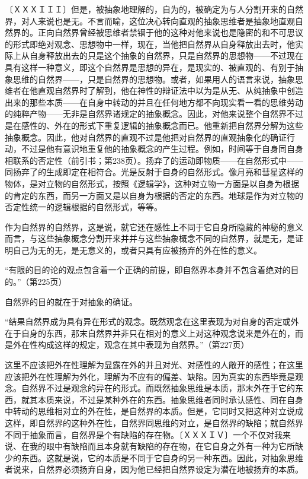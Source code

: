 \documentclass[a4paper,twoside,12pt]{ctexart}
\begin{document}
〔ＸＸＸＩＩＩ〕但是，被抽象地理解的，自为的，被确定为与人分割开来的自然界，对人来说也是无。不言而喻，这位决心转向直观的抽象思维者是抽象地直观自然界的。正向自然界曾经被思维者禁锢于他的这种对他来说也是隐密的和不可思议的形式即绝对观念、思想物中一样，现在，当他把自然界从自身释放出去时，他实际上从自身释放出去的只是这个抽象的自然界，只是自然界的思想物——不过现在具有这样一种意义，即这个自然界是思想的异在，是现实的、被直观的、有别于抽象思维的自然界——，只是自然界的思想物。或者，如果用人的语言来说，抽象思维者在他直观自然界时了解到，他在神性的辩证法中以为是从无、从纯抽象中创造出来的那些本质——在自身中转动的并且在任何地方都不向现实看一看的思维劳动的纯粹产物——无非是自然界诸规定的抽象概念。因此，对他来说整个自然界不过是在感性的、外在的形式下重复逻辑的抽象概念而已。他重新把自然界分解为这些抽象概念。因此，他对自然界的直观不过是他把对自然界的直观抽象化的确证行动，不过是他有意识地重复他的抽象概念的产生过程。例如，时间等于自身同自身相联系的否定性（前引书；第238页）。扬弃了的运动即物质——在自然形式中——同扬弃了的生成即定在相符合。光是反射于自身的自然形式。像月亮和彗星这样的物体，是对立物的自然形式，按照《逻辑学》，这种对立物一方面是以自身为根据的肯定的东西，而另一方面又是以自身为根据的否定的东西。地球是作为对立物的否定性统一的逻辑根据的自然形式，等等。

作为自然界的自然界，这是说，就它还在感性上不同于它自身所隐藏的神秘的意义而言，与这些抽象概念分割开来并并与这些抽象概念不同的自然界，就是无，是证明自己为无的无，是无意义的，或者只具有应被扬弃的外在性的意义。

\begin{fangsong}
“有限的目的论的观点包含着一个正确的前提，即自然界本身并不包含着绝对的目的。”（第225页）
\end{fangsong}

自然界的目的就在于对抽象的确证。

\begin{fangsong}
“结果自然界成为具有异在形式的观念。既然观念在这里表现为对自身的否定或外在于自身的东西，那末自然界并非只在相对的意义上对这种观念说来是外在的，而是外在性构成这样的规定，观念在其中表现为自然界。”（第227页）
\end{fangsong}

这里不应该把外在性理解为显露在外的并且对光、对感性的人敞开的感性；在这里应该把外在性理解为外化，理解为不应有的偏差、缺陷。因为真实的东西毕竟是观念。自然界不过是观念的异在的形式。而既然抽象思维是本质，那末外在于它的东西，就其本质来说，不过是某种外在的东西。抽象思维者同时承认感性、同在自身中转动的思维相对立的外在性，是自然界的本质。但是，它同时又把这种对立说成这样，即自然界的这种外在性，自然界同思维的对立，是自然界的缺陷；就自然界不同于抽象而言，自然界是个有缺陷的存在物。〔ＸＸＸＩＶ〕一个不仅对我来说、在我的眼中有缺陷而且本身就有缺陷的存在物，在它自身之外有一种为它所缺少的东西。这就是说，它的本质是不同于它自身的另一种东西。因此，对抽象思维者说来，自然界必须扬弃自身，因为他已经把自然界设定为潜在地被扬弃的本质。
\end{document}
